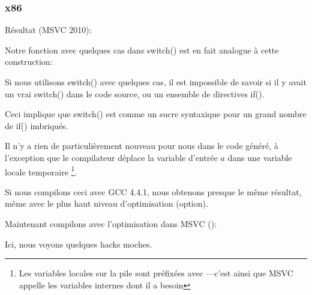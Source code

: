 \subsubsection{x86}


Résultat (MSVC 2010):



Notre fonction avec quelques cas dans switch() est en fait analogue à cette construction:




Si nous utilisons switch() avec quelques cas, il est impossible de savoir si il y
avait un vrai switch() dans le code source, ou un ensemble de directives if().
\myindex{\SyntacticSugar}

Ceci implique que switch() est comme un sucre syntaxique pour un grand nombre de if()
imbriqués.

Il n'y a rien de particulièrement nouveau pour nous dans le code généré, à l'exception
que le compilateur déplace la variable d'entrée $a$ dans une variable locale temporaire
 \footnote{Les variables locales sur la pile sont préfixées avec ---c'est
ainsi que MSVC appelle les variables internes dont il a besoin}.

Si nous compilons ceci avec GCC 4.4.1, nous obtenons presque le même résultat,
même avec le plus haut niveau d'optimisation (\Othree option).


Maintenant compilons avec l'optimisation dans MSVC (\Ox): 

\label{JMP_instead_of_RET}


Ici, nous voyons quelques hacks moches.

